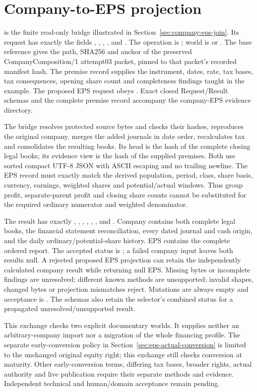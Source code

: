 \section{Company-to-EPS projection}
\label{sec:company-eps-records}

 is the finite read-only bridge illustrated in
Section~\ref{sec:company-eps-join}. Its request has exactly the fields
, , , ,
 and . The operation is ; world is
 or . The base reference gives the path,
SHA256 and anchor of the preserved CompanyComposition/1 attempt03 packet,
pinned to that packet's recorded manifest hash. The premise record supplies
the instrument, dates, rate, tax bases, tax consequences, opening share count
and completeness findings taught in the example. The proposed EPS request
obeys . Exact closed Request/Result schemas and the complete
premise record accompany the company-EPS evidence directory.

The bridge resolves protected source bytes and checks their hashes, reproduces
the original company, merges the added journals in date order, recalculates
tax and consolidates the resulting books. Its head is the hash of the complete
closing legal books; its evidence view is the hash of the supplied premises.
Both use sorted compact UTF-8 JSON with ASCII escaping and no trailing newline.
The EPS record must exactly match the derived population, period, class,
share basis, currency, earnings, weighted shares and potential/actual windows.
Thus group profit, separate-parent profit and closing share counts cannot be
substituted for the required ordinary numerator and weighted denominator.

The result has exactly , , ,
, , ,  and
. Company contains both complete legal books, the financial
statement reconciliation, every dated journal and cash origin, and the daily
ordinary/potential-share history. EPS contains the complete ordered report.
The accepted status is ; a failed company input
leaves both results null. A rejected proposed EPS projection can retain the
independently calculated company result while returning null EPS. Missing
bytes or incomplete findings are unresolved; different known methods are
unsupported; invalid shapes, changed bytes or projection mismatches reject.
Mutations are always empty and acceptance is
. The schemas also retain the selector's
combined  status for a propagated unresolved/unsupported result.

This exchange checks two explicit documentary worlds. It supplies neither
an arbitrary-company import nor a migration of the whole financing profile.
The separate early-conversion policy in Section~\ref{sec:eps-actual-conversion} is
limited to the unchanged original equity right; this exchange still checks
conversion at maturity. Other early-conversion terms, differing tax bases,
broader rights, actual authority and live publication require their separate
methods and evidence. Independent technical and human/domain acceptance
remain pending.

